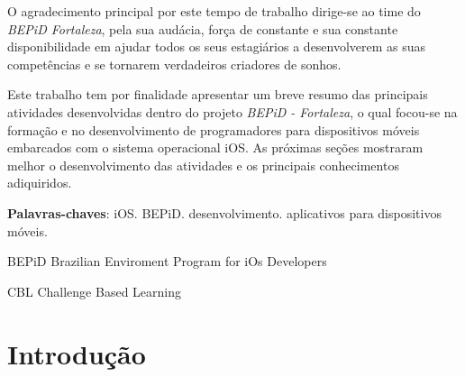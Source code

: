 \documentclass[
	12pt,				%
	openright,			%
	twoside,			%
	a4paper,			%
	english,			%
	french,				%
	spanish,			%
	brazil,				%
	]{abntex2}
\begin{document}
\frenchspacing 

\begin{agradecimentos}
O agradecimento principal por este tempo de trabalho dirige-se ao time do \textit{ BEPiD Fortaleza}, pela sua audácia, força de constante e sua constante disponibilidade em ajudar todos os seus estagiários a desenvolverem as suas competências e se tornarem verdadeiros criadores de sonhos.
\end{agradecimentos}


\begin{resumo}

Este trabalho tem por finalidade apresentar um breve resumo das principais atividades desenvolvidas dentro do projeto \textit{BEPiD - Fortaleza}, o qual focou-se na formação e no desenvolvimento de programadores para dispositivos móveis embarcados com o sistema operacional iOS. As próximas seções mostraram melhor o desenvolvimento das atividades e os principais conhecimentos adiquiridos.

 \vspace{\onelineskip}
    
 \noindent
 \textbf{Palavras-chaves}: iOS. BEPiD. desenvolvimento. aplicativos para dispositivos móveis.
\end{resumo}

\begin{siglas}
  \item[BEPiD] Brazilian Enviroment Program for iOs Developers
  \item[CBL] Challenge Based Learning
\end{siglas}

\tableofcontents*



\textual

\chapter*[Introdução]{Introdução}
\end{document}
